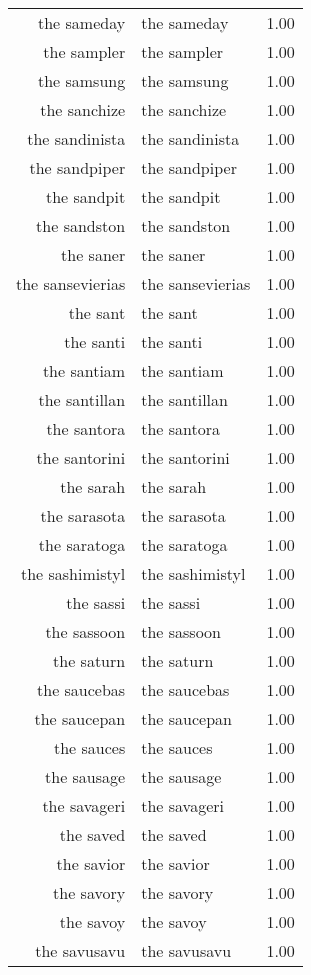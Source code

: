 \begin{table}[ht]
\begin{tabular}{rlr}
  the sameday & the sameday & 1.00 \\ 
  the sampler & the sampler & 1.00 \\ 
  the samsung & the samsung & 1.00 \\ 
  the sanchize & the sanchize & 1.00 \\ 
  the sandinista & the sandinista & 1.00 \\ 
  the sandpiper & the sandpiper & 1.00 \\ 
  the sandpit & the sandpit & 1.00 \\ 
  the sandston & the sandston & 1.00 \\ 
  the saner & the saner & 1.00 \\ 
  the sansevierias & the sansevierias & 1.00 \\ 
  the sant & the sant & 1.00 \\ 
  the santi & the santi & 1.00 \\ 
  the santiam & the santiam & 1.00 \\ 
  the santillan & the santillan & 1.00 \\ 
  the santora & the santora & 1.00 \\ 
  the santorini & the santorini & 1.00 \\ 
  the sarah & the sarah & 1.00 \\ 
  the sarasota & the sarasota & 1.00 \\ 
  the saratoga & the saratoga & 1.00 \\ 
  the sashimistyl & the sashimistyl & 1.00 \\ 
  the sassi & the sassi & 1.00 \\ 
  the sassoon & the sassoon & 1.00 \\ 
  the saturn & the saturn & 1.00 \\ 
  the saucebas & the saucebas & 1.00 \\ 
  the saucepan & the saucepan & 1.00 \\ 
  the sauces & the sauces & 1.00 \\ 
  the sausage & the sausage & 1.00 \\ 
  the savageri & the savageri & 1.00 \\ 
  the saved & the saved & 1.00 \\ 
  the savior & the savior & 1.00 \\ 
  the savory & the savory & 1.00 \\ 
  the savoy & the savoy & 1.00 \\ 
  the savusavu & the savusavu & 1.00 \\ 

\end{tabular}
\end{table}

